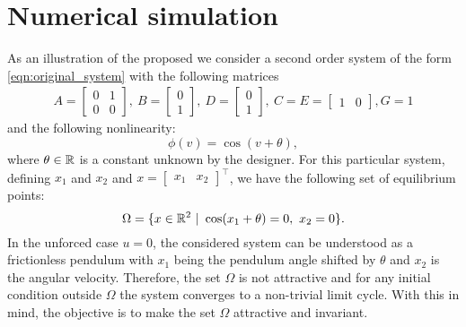 \documentclass{ifacconf}
\begin{document}
\section{Numerical simulation}
As an illustration of the proposed we consider a second order system of the form \eqref{eqn:original_system} with the following matrices
$$
\begin{aligned}
    A = \begin{bmatrix}
        0 & 1\\ 0 & 0
    \end{bmatrix}, \ B = \begin{bmatrix}
        0 \\ 1
    \end{bmatrix}, \ D = \begin{bmatrix}
        0 \\ 1
    \end{bmatrix}, \ C = E= \begin{bmatrix}
        1 & 0
    \end{bmatrix}, G = 1
\end{aligned}
$$
and the following nonlinearity:
$$
\phi(v)=\cos(v+\theta),
$$
where $\theta\in{\mathbb{R}}$ is a constant unknown by the designer. For this particular system, defining $x_1$ and $x_2$ and $x = \begin{bmatrix}
    x_1 & x_2
\end{bmatrix}^\top$, we have the following set of equilibrium points:
$$
\Omega = \{x\in{\mathbb{R}}^2 \ | \ \cos(x_1+\theta)=0, \ x_2 = 0\}.
$$
In the unforced case $u=0$, the considered system can be understood as a frictionless pendulum with $x_1$ being the pendulum angle shifted by $\theta$ and $x_2$ is the angular velocity. Therefore, the set $\Omega$ is not attractive and for any initial condition outside $\Omega$ the system converges to a non-trivial limit cycle. With this in mind, the objective is to make the set $\Omega$ attractive and invariant.
\end{document}
